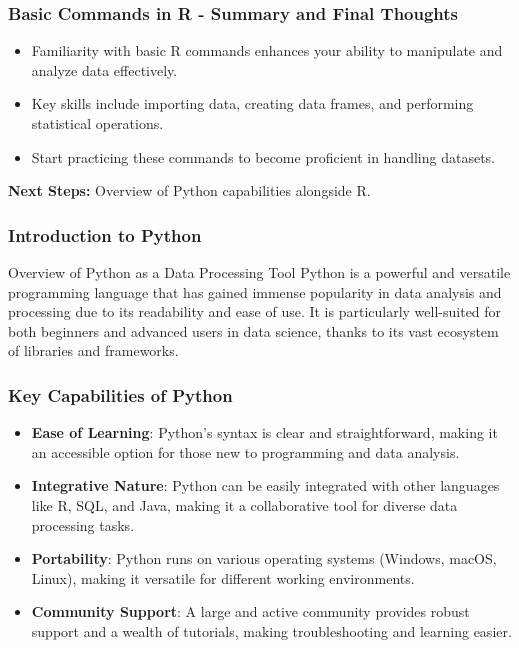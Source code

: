\documentclass[aspectratio=169]{beamer}
\begin{document}
\begin{frame}[fragile]
    \frametitle{Basic Commands in R - Summary and Final Thoughts}
    \begin{itemize}
        \item Familiarity with basic R commands enhances your ability to manipulate and analyze data effectively.
        \item Key skills include importing data, creating data frames, and performing statistical operations.
        \item Start practicing these commands to become proficient in handling datasets.
    \end{itemize}
    \textbf{Next Steps:} Overview of Python capabilities alongside R.
\end{frame}

\begin{frame}
    \frametitle{Introduction to Python}
    \begin{block}{Overview of Python as a Data Processing Tool}
        Python is a powerful and versatile programming language that has gained immense popularity in data analysis and processing due to its readability and ease of use. It is particularly well-suited for both beginners and advanced users in data science, thanks to its vast ecosystem of libraries and frameworks.
    \end{block}
\end{frame}

\begin{frame}
    \frametitle{Key Capabilities of Python}
    \begin{itemize}
        \item \textbf{Ease of Learning}: Python’s syntax is clear and straightforward, making it an accessible option for those new to programming and data analysis.
        \item \textbf{Integrative Nature}: Python can be easily integrated with other languages like R, SQL, and Java, making it a collaborative tool for diverse data processing tasks.
        \item \textbf{Portability}: Python runs on various operating systems (Windows, macOS, Linux), making it versatile for different working environments.
        \item \textbf{Community Support}: A large and active community provides robust support and a wealth of tutorials, making troubleshooting and learning easier.
    \end{itemize}
\end{frame}
\end{document}

